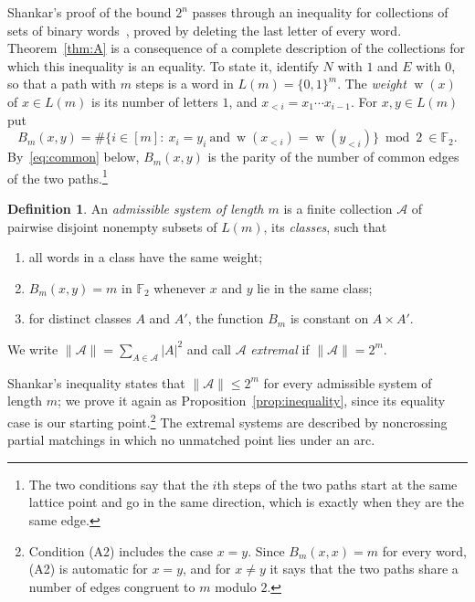 \documentclass[11pt]{amsart}
\theoremstyle{definition}
\newtheorem{definition}[theorem]{Definition}
\theoremstyle{remark}
\numberwithin{equation}{section}
\newcommand{\F}{\mathbb{F}}
\newcommand{\cA}{\mathcal{A}}
\DeclareMathOperator{\wt}{w}
\begin{document}
Shankar's proof of the bound $2^n$ passes through an inequality for collections of sets of binary words~\cite[Lemma~2.3]{Sh}, proved by deleting the last letter of every word. Theorem~\ref{thm:A} is a consequence of a complete description of the collections for which this inequality is an equality. To state it, identify $N$ with $1$ and $E$ with $0$, so that a path with $m$ steps is a word in $L(m)=\{0,1\}^m$. The \emph{weight} $\wt(x)$ of $x\in L(m)$ is its number of letters $1$, and $x_{<i}=x_1\cdots x_{i-1}$. For $x,y\in L(m)$ put
\[
B_m(x,y)=\#\{i\in[m]:\ x_i=y_i\ \text{and}\ \wt(x_{<i})=\wt(y_{<i})\}\bmod 2\ \in\F_2 .
\]
By~\eqref{eq:common} below, $B_m(x,y)$ is the parity of the number of common edges of the two paths.\footnote{The two conditions say that the $i$th steps of the two paths start at the same lattice point and go in the same direction, which is exactly when they are the same edge.}

\begin{definition}\label{def:admissible}
An \emph{admissible system of length $m$} is a finite collection $\cA$ of pairwise disjoint nonempty subsets of $L(m)$, its \emph{classes}, such that
\begin{enumerate}[label=\textup{(A\arabic*)}]
\item all words in a class have the same weight;
\item $B_m(x,y)=m$ in $\F_2$ whenever $x$ and $y$ lie in the same class;
\item for distinct classes $A$ and $A'$, the function $B_m$ is constant on $A\times A'$.
\end{enumerate}
We write $\|\cA\|=\sum_{A\in\cA}|A|^2$ and call $\cA$ \emph{extremal} if $\|\cA\|=2^m$.
\end{definition}

Shankar's inequality states that $\|\cA\|\le 2^m$ for every admissible system of length $m$; we prove it again as Proposition~\ref{prop:inequality}, since its equality case is our starting point.\footnote{Condition (A2) includes the case $x=y$. Since $B_m(x,x)=m$ for every word, (A2) is automatic for $x=y$, and for $x\ne y$ it says that the two paths share a number of edges congruent to $m$ modulo $2$.} The extremal systems are described by noncrossing partial matchings in which no unmatched point lies under an arc.
\end{document}
